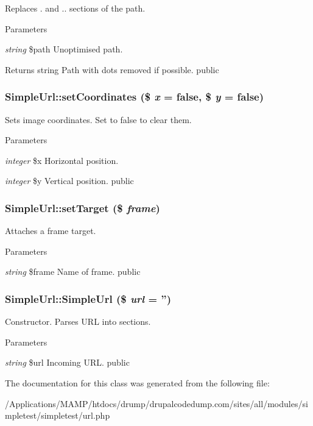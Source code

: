 \label{class_simple_url_a50e343f5c31919b3d1051760f32ec3ae}
Replaces . and .. sections of the path. 
\begin{DoxyParams}{Parameters}
\item[{\em string}]\$path Unoptimised path. \end{DoxyParams}
\begin{DoxyReturn}{Returns}
string Path with dots removed if possible.  public 
\end{DoxyReturn}
\hypertarget{class_simple_url_a69470a9a8b5b189e01e690b13b4aef77}{
\subsubsection[{setCoordinates}]{\setlength{\rightskip}{0pt plus 5cm}SimpleUrl::setCoordinates (\$ {\em x} = {\ttfamily false}, \/  \$ {\em y} = {\ttfamily false})}}
\label{class_simple_url_a69470a9a8b5b189e01e690b13b4aef77}
Sets image coordinates. Set to false to clear them. 
\begin{DoxyParams}{Parameters}
\item[{\em integer}]\$x Horizontal position. \item[{\em integer}]\$y Vertical position.  public \end{DoxyParams}
\hypertarget{class_simple_url_a73145ca562cfc288ad71792ae0027448}{
\subsubsection[{setTarget}]{\setlength{\rightskip}{0pt plus 5cm}SimpleUrl::setTarget (\$ {\em frame})}}
\label{class_simple_url_a73145ca562cfc288ad71792ae0027448}
Attaches a frame target. 
\begin{DoxyParams}{Parameters}
\item[{\em string}]\$frame Name of frame.  public \end{DoxyParams}
\hypertarget{class_simple_url_a9a1eb8b05dc012664cf56910520b96a2}{
\subsubsection[{SimpleUrl}]{\setlength{\rightskip}{0pt plus 5cm}SimpleUrl::SimpleUrl (\$ {\em url} = {\ttfamily ''})}}
\label{class_simple_url_a9a1eb8b05dc012664cf56910520b96a2}
Constructor. Parses URL into sections. 
\begin{DoxyParams}{Parameters}
\item[{\em string}]\$url Incoming URL.  public \end{DoxyParams}


The documentation for this class was generated from the following file:\begin{DoxyCompactItemize}
\item 
/Applications/MAMP/htdocs/drump/drupalcodedump.com/sites/all/modules/simpletest/simpletest/url.php\end{DoxyCompactItemize}
